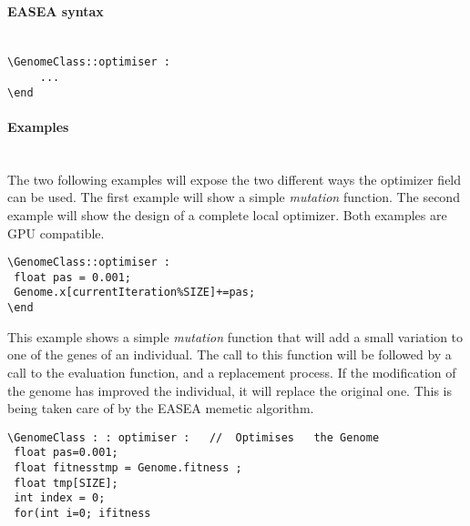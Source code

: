 \documentclass{book}
\begin{document}
\paragraph{EASEA syntax}\label{easea-syntax-9}
~\\

\texttt{\textbackslash{}GenomeClass::optimiser~:}\\\texttt{~~~~~...}\\\texttt{\textbackslash{}end}

\paragraph{Examples}\label{examples}
~\\

The two following examples will expose the two different ways the
optimizer field can be used. The first example will show a simple
\emph{mutation} function. The second example will show the design of a
complete local optimizer. Both examples are GPU compatible.

\begin{description}
\itemsep1pt\parskip0pt
\item[Genome optimization only]
\end{description}

\texttt{\textbackslash{}GenomeClass::optimiser~:}\\\texttt{~float~pas~=~0.001;}\\\texttt{~Genome.x{[}currentIteration\%SIZE{]}+=pas;}\\\texttt{\textbackslash{}end}

This example shows a simple \emph{mutation} function that will add a
small variation to one of the genes of an individual. The call to this
function will be followed by a call to the evaluation function, and a
replacement process. If the modification of the genome has improved the
individual, it will replace the original one. This is being taken care
of by the EASEA memetic algorithm.

\begin{description}
\itemsep1pt\parskip0pt
\item[Complete local optimizer]
\end{description}

\texttt{\textbackslash{}GenomeClass~:~:~optimiser~:~~~//~~Optimises~~~the~Genome~}\\\texttt{~float~pas=0.001;}\\\texttt{~float~fitnesstmp~=~Genome.fitness~;~}\\\texttt{~float~tmp{[}SIZE{]};~}\\\texttt{~int~index~=~0;}\\\texttt{~for(int~i=0;~i}\texttt{fitness}
\end{document}
